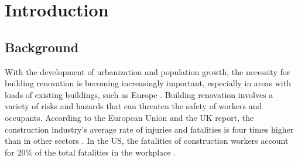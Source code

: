 \section{Introduction}
\label{sec:introduction}
\subsection*{Background}
\label{sec:background}
With the development of urbanization and population growth, 
the necessity for building renovation is becoming increasingly important, especially in areas with loads of existing buildings, such as Europe \cite[]{jensen2015value}.
Building renovation involves a variety of risks and hazards that can threaten the safety of workers and occupants.
According to the European Union and the UK report, 
the construction industry's average rate of injuries and fatalities is four times higher than in other sectors \cite[]{estudillo2024role,britain2001health}. 
In the US, the fatalities of construction workers account for 20\% of the total fatalities in the workplace \cite[]{kim2016integrating}.

